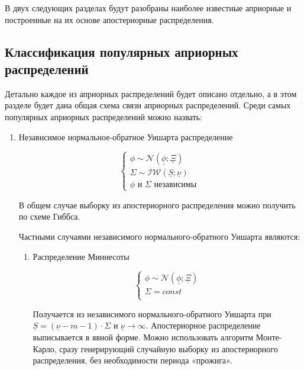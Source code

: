 \documentclass[11pt]{article} %
\newcommand{\cN}{\mathcal{N}}
\newcommand{\cIW}{\mathcal{IW}}
\newcommand{\prior}{\underline}
\begin{document}
В двух следующих разделах будут разобраны наиболее известные априорные и построенные на их основе апостериорные распределения.  


\subsection{Классификация популярных априорных распределений}



Детально каждое из априорных распределений будет описано отдельно, а в
этом разделе будет дана общая схема связи априорных распределений.
Среди самых популярных априорных распределений можно назвать:

\begin{enumerate}

\item Независимое нормальное-обратное Уишарта распределение


\begin{equation}
\begin{cases}
\phi \sim \cN(\prior\phi; \prior\Xi ) \\
\Sigma \sim \cIW(\prior S; \prior\nu) \\
\phi \text{ и } \Sigma \text{ независимы }
\end{cases}
\end{equation}


В общем случае выборку из  апостериорного распределения можно получить
по схеме Гиббса.


Частными случаями независимого нормального-обратного Уишарта являются:


\begin{enumerate}

\item Распределение Миннесоты


\begin{equation}
\begin{cases}
\phi \sim \cN(\prior\phi; \prior\Xi ) \\
\Sigma = const \\
\end{cases}
\end{equation}


Получается из независимого нормального-обратного Уишарта при $\prior
S=(\prior \nu-m-1) \cdot \Sigma$ и $\prior \nu \to \infty$.
Апостериорное распределение выписывается в явной форме. Можно
использовать алгоритм Монте-Карло, сразу генерирующий случайную
выборку из апостериорного распределения, без необходимости периода
«прожига».



\end{enumerate}
\end{enumerate}
\end{document}
